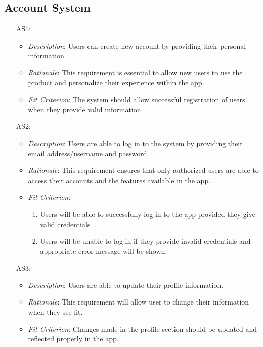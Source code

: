 \documentclass[12pt]{article}
\begin{document}
\subsection{Account System}
\noindent \begin{itemize}
    \item[AS1:] 
    \begin{itemize}
        \item \textit{Description}: Users can create new account by providing their personal information.
        \item \textit{Rationale}: This requirement is essential to allow new users to use the product and personalize their experience within the app.
        \item \textit{Fit Criterion}: The system should allow successful registration of users when they provide valid information
    \end{itemize}
    \item[AS2:] 
    \begin{itemize}
        \item \textit{Description}: Users are able to log in to the system by providing their email address/username and password.
        \item \textit{Rationale}: This requirement ensures that only authorized users are able to access their accounts and the features available in the app.
        \item \textit{Fit Criterion}: 
        \begin{enumerate}
            \item Users will be able to successfully log in to the app provided they give valid credentials
            \item Users will be unable to log in if they provide invalid credentials and appropriate error message will be shown.
        \end{enumerate}
    \end{itemize}
    \item[AS3:] 
    \begin{itemize}
        \item \textit{Description}: Users are able to update their profile information.
        \item \textit{Rationale}: This requirement will allow user to change their information when they see fit.
        \item \textit{Fit Criterion}: Changes made in the profile section should be updated and reflected properly in the app.
    \end{itemize}

\end{itemize}
\end{document}
